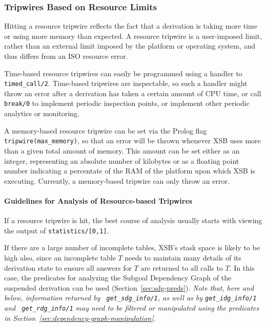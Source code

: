 \subsubsection{Tripwires Based on Resource Limits}
%
Hitting a resource tripwire reflects the fact that a derivation is
taking more time or using more memory than expected.  A resource
tripwire is a user-imposed limit, rather than an external limit
imposed by the platform or operating system, and thus differs from an
ISO resource error.

Time-based resource tripwires can easily be programmed using a handler
to {\tt timed\_call/2}.  Time-based tripwires are inspectable, so such
a handler might throw an error after a derivation has taken a certain
amount of CPU time, or call {\tt break/0} to implement periodic
inspection points, or implement other periodic analytics or
monitoring.

A memory-based resource tripwire can be set via the Prolog flag {\tt
  tripwire(max\_memory)}, so that an error will be thrown whenever XSB
uses more than a given total amount of memory.  This amount can be set
either as an integer, representing an absolute number of kilobytes or
as a floating point number indicating a percentate of the RAM of the
platform upon which XSB is executing.  Currently, a memory-based
tripwire can only throw an error.

\paragraph{Guidelines for Analysis of Resource-based Tripwires} 
If a resource tripwire is hit, the best course of analysis usually
starts with viewing the output of {\tt statistics/[0,1]}.  
\bi
\item If there are a large number of incomplete tables, XSB's stask
  space is likely to be high also, since an incomplete table $T$ needs
  to maintain many details of its derivation state to ensure all
  answers for $T$ are returned to all calls to $T$.  In this case,
  the predicates for analyzing the Subgoal Dependency Graph of the
  suspended derivation can be used (Section~\ref{sec:sdg-preds}).
  {\em Note that, here and below, information returned by {\tt
      get\_sdg\_info/1}, as well as by {\tt get\_idg\_info/1} and {\tt
      get\_rdg\_info/1} may need to be filtered or manipulated using
    the predicates in
    Section~\ref{sec:dependency-graph-manipulation}.}

